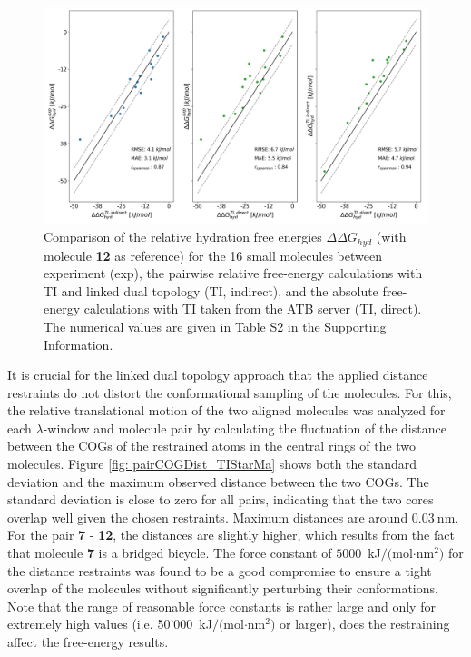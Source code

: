 \begin{figure}[h!]
    \centering
    \includegraphics[width=\textwidth]{fig/results/pairwise/FE/M030_graph_ddG_solv_correlation_ATB_TI.png}
    \caption{Comparison of the relative hydration free energies $\Delta \Delta G_{hyd}$ (with molecule \textbf{12} as reference) for the 16 small molecules between experiment (exp), the pairwise relative free-energy calculations with TI and linked dual topology (TI, indirect), and the absolute free-energy calculations with TI taken from the ATB server\cite{Stroet2018} (TI, direct). The numerical values are given in Table S2 in the Supporting Information.} %
    \label{fig: pairCorr}
\end{figure}

It is crucial for the linked dual topology approach that the applied distance restraints do not distort the conformational sampling of the molecules. 
For this, the relative translational motion of the two aligned molecules was analyzed for each $\lambda$-window and molecule pair by calculating the fluctuation of the distance between the COGs of the restrained atoms in the central rings of the two molecules. Figure \ref{fig: pairCOGDist_TIStarMa} shows both the standard deviation and the maximum observed distance between the two COGs. 
The standard deviation is close to zero for all pairs, indicating that the two cores overlap well given the chosen restraints. Maximum distances are around $0.03~$nm. For the pair \textbf{7} - \textbf{12}, the distances are slightly higher, which results from the fact that molecule \textbf{7} is a bridged bicycle. The force constant of $5000$~kJ$/($mol$\cdot$nm$^2)$ for the distance restraints was found to be a good compromise to ensure a tight overlap of the molecules without significantly perturbing their conformations. Note that the range of reasonable force constants is rather large and only for extremely high values (i.e. 50'000~kJ$/($mol$\cdot$nm$^2)$ or larger), does the restraining affect the free-energy results.

